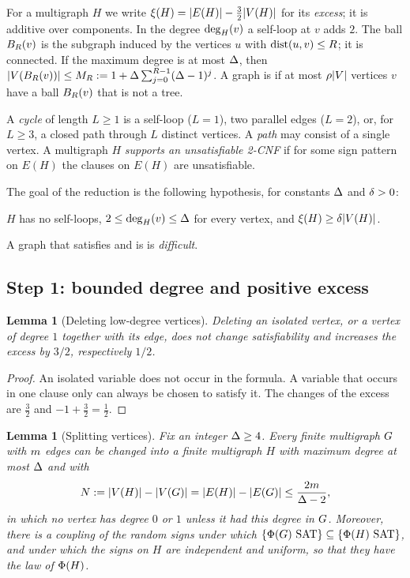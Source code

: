 \documentclass[11pt,a4paper]{article}
\newtheorem{lemma}[theorem]{Lemma}
\theoremstyle{definition}
\theoremstyle{remark}
\theoremstyle{plain}
\theoremstyle{definition}
\begin{document}
For a multigraph \(H\) we write \(\xi(H)=|E(H)|-\frac32|V(H)|\) for its
\emph{excess}; it is additive over components. In the degree \(\deg_{H}(v)\) a
self-loop at \(v\) adds \(2\). The ball \(B_{R}(v)\) is the subgraph induced by
the vertices \(u\) with \(\operatorname{dist}(u,v)\le R\); it is connected. If the maximum
degree is at most \(\Delta\), then \(|V(B_{R}(v))|\le M_{R}:=1+\Delta\sum_{j=0}^{R-1}
(\Delta-1)^j\). A graph is \emph{\loctree{\rad}{\nontree}} if at most
\(\rho|V|\) vertices \(v\) have a ball \(B_{R}(v)\) that is not a tree.

A \emph{cycle} of length \(L\ge1\) is a self-loop (\(L=1\)), two parallel edges
(\(L=2\)), or, for \(L\ge3\), a closed path through \(L\) distinct vertices. A
\emph{path} may consist of a single vertex. A multigraph \(H\) \emph{supports an
unsatisfiable 2-CNF} if for some sign pattern on \(E(H)\) the clauses on
\(E(H)\) are unsatisfiable.

The goal of the reduction is the following hypothesis, for constants
\(\Delta\) and \(\delta>0\):

\medskip
\noindent\Hyp{} \(H\) has no self-loops, \(2\le\deg_{H}(v)\le\Delta\) for every
vertex, and \(\xi(H)\ge\delta|V(H)|\).
\medskip

\noindent A graph that satisfies \Hyp{} and is \loctree{\rad}{\nontree} is
\emph{difficult}.

\subsection{Step 1: bounded degree and positive excess}

\begin{lemma}[Deleting low-degree vertices]\label{lem:leaf}
Deleting an isolated vertex, or a vertex of degree \(1\) together with its
edge, does not change satisfiability and increases the excess by \(3/2\),
respectively \(1/2\).
\end{lemma}

\begin{proof}
An isolated variable does not occur in the formula. A variable that occurs in
one clause only can always be chosen to satisfy it. The changes of the excess
are \(\frac32\) and \(-1+\frac32=\frac12\).
\end{proof}

\begin{lemma}[Splitting vertices]\label{lem:splitting}
Fix an integer \(\Delta\ge4\). Every finite multigraph \(G\) with \(m\)
edges can be changed into a finite multigraph \(H\) with maximum degree at
most \(\Delta\) and with
\[
  N:=|V(H)|-|V(G)|=|E(H)|-|E(G)|\le\frac{2m}{\Delta-2},
\]
in which no vertex has degree \(0\) or \(1\) unless it had this degree in
\(G\). Moreover, there is a coupling of the random signs under which
\(\{\Phi(G)\text{ SAT}\}\subseteq\{\Phi(H)\text{ SAT}\}\), and under which the signs on
\(H\) are independent and uniform, so that they have the law of \(\Phi(H)\).
\end{lemma}
\end{document}
